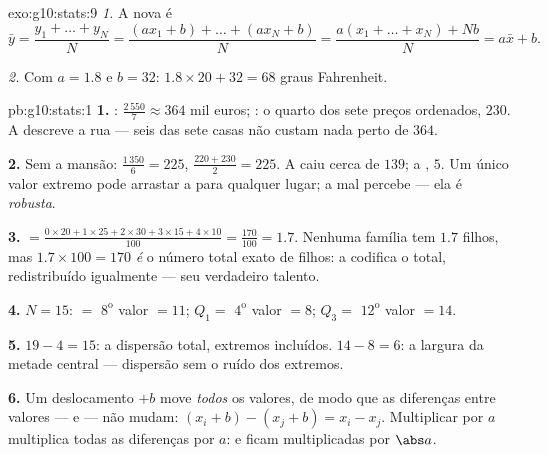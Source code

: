 \begin{solution}{exo:g10:stats:9}
\emph{1.} A nova  é
\[
\bar y = \frac{y_1 + \dots + y_N}{N}
= \frac{(a x_1 + b) + \dots + (a x_N + b)}{N}
= \frac{a(x_1 + \dots + x_N) + Nb}{N}
= a \bar x + b .
\]

\emph{2.} Com $a = 1.8$ e $b = 32$: 
$1.8 \times 20 + 32 = 68$ graus Fahrenheit.
\end{solution}

\begin{solution}{pb:g10:stats:1}
\textbf{1.} : $\frac{2\,550}{7} \approx 364$ mil euros;
: o quarto dos sete preços ordenados, $230$. A 
descreve a rua --- seis das sete casas não custam nada perto de
$364$.

\textbf{2.} Sem a mansão:  $\frac{1\,350}{6} = 225$,
 $\frac{220 + 230}{2} = 225$. A  caiu cerca de
$139$; a , $5$. Um único valor extremo pode arrastar a
 para qualquer lugar; a  mal percebe --- ela é
\emph{robusta}.

\textbf{3.}  $= \frac{0 \times 20 + 1 \times 25 + 2 \times
30 + 3 \times 15 + 4 \times 10}{100} = \frac{170}{100} = 1.7$.
Nenhuma família tem $1.7$ filhos, mas $1.7 \times 100 = 170$
\emph{é} o número total exato de filhos: a  codifica o
total, redistribuído igualmente --- seu verdadeiro talento.

\textbf{4.} $N = 15$:  $=$ $8^{\text{o}}$ valor $= 11$;
$Q_1 =$ $4^{\text{o}}$ valor $= 8$; $Q_3 =$ $12^{\text{o}}$
valor $= 14$.

\textbf{5.}  $19 - 4 = 15$: a dispersão total,
extremos incluídos.  $14 - 8 = 6$: a
largura da metade central --- dispersão sem o ruído dos
extremos.

\textbf{6.} Um deslocamento $+b$ move \emph{todos} os valores,
de modo que as diferenças entre valores ---  e
 --- não mudam:
$(x_i + b) - (x_j + b) = x_i - x_j$. Multiplicar por $a$
multiplica todas as diferenças por $a$:  e  ficam multiplicadas por $\abs a$.


\end{solution}
